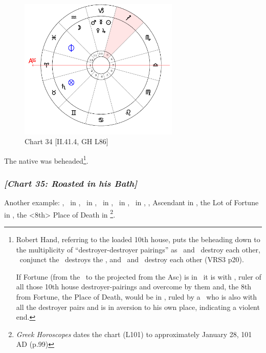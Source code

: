 \clearpage
\begin{figure}
\centering
\vspace{-20pt}
\includegraphics[width=0.68\textwidth]{charts/2_41_4}
\caption{Chart 34 [II.41.4, GH L86]}
\label{fig:chart34}
\end{figure} 

The native was beheaded\footnote{Robert Hand, referring to the loaded 10th house, puts the beheading down to the multiplicity of ``destroyer-destroyer pairings'' as  \Jupiter\, and \Venus\, destroy each other, \Jupiter\, conjunct the \Sun\, destroys the \Sun, and \Mercury\, and \Mars\, destroy each other (VRS3 p20).
  
If Fortune (from the \Sun\, to the \Moon projected from the Asc) is in \Taurus\, it is with \Saturn, ruler of all those 10th house destroyer-pairings and overcome by them and, the 8th from Fortune, the Place of Death, would be in \Sagittarius, ruled by a \Jupiter\, who is also with all the destroyer pairs and is in aversion to his own place, indicating a violent end.}.
\newpage
\subsubsection{\textit{[Chart 35: Roasted in his Bath]}}
Another example: \Sun, \Venus\, in \Aquarius, \Moon\, in \Gemini, \Saturn\, in \Scorpio, \Jupiter\, in \Pisces, \Mars\, in \Cancer, \Mercury, Ascendant in \Capricorn, the Lot of Fortune in \Virgo, the <8th> Place of Death in \Aries
\footnote{\textit{Greek Horoscopes} dates the chart (L101) to approximately January 28, 101 AD (p.99)}.

